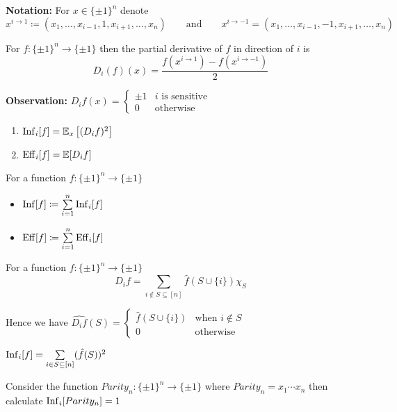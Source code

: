 \textbf{Notation:} For $x\in \{\pm 1\}^n$ denote $$x^{i\to 1}\coloneqq (x_1,\dots, x_{i-1},1,x_{i+1},\dots, x_n)\qquad \text{and}\qquad x^{i\to -1}=(x_1,\dots, x_{i-1}, -1,x_{i+1},\dots, x_n)$$
\begin{definition}
	For $f:\{\pm 1\}^n\to \{\pm 1\}$ then the partial derivative of $f$ in direction of $i$ is $$D_i(f)(x)=\frac{f(x^{i\to 1})-f(x^{i\to -1})}{2}$$
\end{definition}

\textbf{Observation:} $D_if(x)=\begin{cases}
	\pm 1 & \text{$i$ is sensitive}\\
	0 & \text{otherwise}
\end{cases}$

\begin{lemma}
	\begin{enumerate}
		\item $\operatorname{Inf}_i[f]=\mathbb{E}_{x}\left[(D_if)^2\right]$
		\item $\operatorname{Eff}_i[f]=\mathbb{E}[D_if]$
	\end{enumerate}
\end{lemma}
\begin{definition}For a function $f:\{\pm 1\}^n\to \{\pm 1\}$
	\begin{itemize}
		\item $\operatorname{Inf}[f]\coloneqq \sum\limits_{i=1}^n \operatorname{Inf}_i[f]$
		\item $\operatorname{Eff}[f]\coloneqq \sum\limits_{i=1}^n \operatorname{Eff}_i[f]$
	\end{itemize}
\end{definition}
\begin{note}For a function $f:\{\pm 1\}^n\to \{\pm 1\}$	$$D_if=\sum\limits_{i\notin S\subseteq [n]}\hat{f}(S\cup \{i\})\chi_S$$
\end{note}Hence we have $\widehat{D_if}(S)=\begin{cases}
\hat{f}(S\cup \{i\})&\text{when $i\notin S$}\\
0 & \text{otherwise}
\end{cases}$
\begin{corollary}\label{influence-fourier-coeff}
	$\operatorname{Inf}_i[f]=\sum\limits_{i\in S\subseteq [n]} (\hat{f}(S))^2$
\end{corollary}
\begin{question}[ $\ifl_i{[Parity_n]}$]
	Consider the function $Parity_n:\{\pm 1\}^n\to \{\pm 1\}$ where $Parity_n=x_1\cdots x_n$ then  calculate $\operatorname{Inf}_i[Parity_n]=1$
\end{question}

